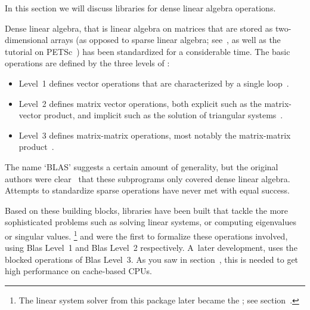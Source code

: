 

In this section we will discuss libraries for dense linear
algebra operations.

Dense linear algebra, that is linear algebra on matrices that are
stored as two-dimensional arrays (as opposed to sparse linear algebra;
see~, as well as the
tutorial on PETSc~) has been standardized for a
considerable time. The basic operations are defined by the three
levels of :
\begin{itemize}
\item Level~1 defines vector operations that are characterized by a
  single loop~\cite{Lawson:blas}.
\item Level~2 defines matrix vector operations, both explicit such as
  the matrix-vector product, and implicit such as the solution of
  triangular systems~\cite{BLAS2}.
\item Level~3 defines matrix-matrix operations, most notably the
  matrix-matrix product~\cite{BLAS3}.
\end{itemize}
The name `BLAS' suggests a certain amount of generality, but the
original authors were clear~\cite{Lawson:blas} that these subprograms
only covered dense linear algebra. Attempts to standardize sparse
operations have never met with equal success.

Based on these building blocks, libraries have been built that tackle
the more sophisticated problems such as solving linear systems, or
computing eigenvalues or singular values.
\footnote{The linear system solver from this
  package later became the ; see
  section~.} and  were the first to formalize
these operations involved, using Blas Level~1 and Blas Level~2
respectively.  A~later development,  uses the
blocked operations of Blas Level~3. As you saw in
section~, this is needed to get high performance on
cache-based CPUs.


